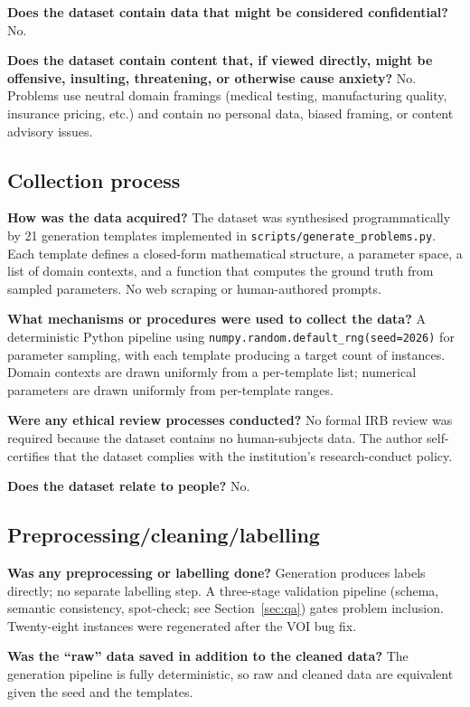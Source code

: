 \documentclass{article}
\begin{document}
\textbf{Does the dataset contain data that might be considered confidential?}
No.

\textbf{Does the dataset contain content that, if viewed directly, might be offensive, insulting, threatening, or otherwise cause anxiety?}
No. Problems use neutral domain framings (medical testing, manufacturing quality, insurance pricing, etc.) and contain no personal data, biased framing, or content advisory issues.

\subsection*{Collection process}

\textbf{How was the data acquired?}
The dataset was synthesised programmatically by 21 generation templates implemented in \texttt{scripts/generate\_problems.py}. Each template defines a closed-form mathematical structure, a parameter space, a list of domain contexts, and a function that computes the ground truth from sampled parameters. No web scraping or human-authored prompts.

\textbf{What mechanisms or procedures were used to collect the data?}
A deterministic Python pipeline using \texttt{numpy.random.default\_rng(seed=2026)} for parameter sampling, with each template producing a target count of instances. Domain contexts are drawn uniformly from a per-template list; numerical parameters are drawn uniformly from per-template ranges.

\textbf{Were any ethical review processes conducted?}
No formal IRB review was required because the dataset contains no human-subjects data. The author self-certifies that the dataset complies with the institution's research-conduct policy.

\textbf{Does the dataset relate to people?}
No.

\subsection*{Preprocessing/cleaning/labelling}

\textbf{Was any preprocessing or labelling done?}
Generation produces labels directly; no separate labelling step. A three-stage validation pipeline (schema, semantic consistency, spot-check; see Section~\ref{sec:qa}) gates problem inclusion. Twenty-eight instances were regenerated after the VOI bug fix.

\textbf{Was the ``raw'' data saved in addition to the cleaned data?}
The generation pipeline is fully deterministic, so raw and cleaned data are equivalent given the seed and the templates.
\end{document}
